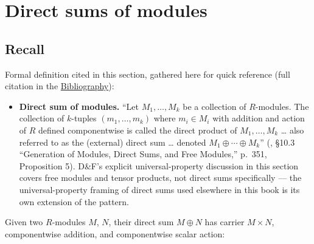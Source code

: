 \section{Direct sums of modules}\label{sec:10-modules:06-direct-sums:1}

\subsection{Recall}\label{sec:10-modules:06-direct-sums:2}

Formal definition cited in this section, gathered here for quick reference (full citation in the \hyperref[sec:root:bibliography:1]{Bibliography}):

\begin{itemize}
\tightlist
\item
  \textbf{Direct sum of modules.} ``Let \(M_1, \ldots, M_k\) be a collection of \(R\)-modules. The collection of \(k\)-tuples \((m_1, \ldots, m_k)\) where \(m_i \in M_i\) with addition and action of \(R\) defined componentwise is called the direct product of \(M_1, \ldots, M_k\) \ldots{} also referred to as the (external) direct sum \ldots{} denoted \(M_1 \oplus \cdots \oplus M_k\)'' (\cite{DummitFoote2003}, §10.3 ``Generation of Modules, Direct Sums, and Free Modules,'' p.~351, Proposition 5). D\&F's explicit universal-property discussion in this section covers free modules and tensor products, not direct sums specifically --- the universal-property framing of direct sums used elsewhere in this book is its own extension of the pattern.
\end{itemize}

Given two \(R\)-modules \(M\), \(N\), their direct sum \(M \oplus N\) has carrier \(M \times N\), componentwise addition, and componentwise scalar action:

